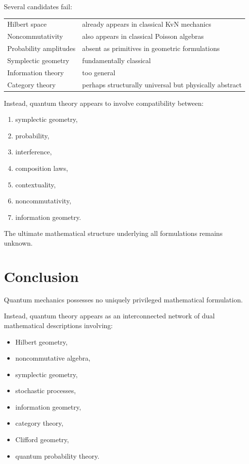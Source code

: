 \documentclass[11pt]{article}
\begin{document}
Several candidates fail:

\begin{center}
\begin{tabular}{ll}
Hilbert space & already appears in classical KvN mechanics \\
Noncommutativity & also appears in classical Poisson algebras \\
Probability amplitudes & absent as primitives in geometric formulations \\
Symplectic geometry & fundamentally classical \\
Information theory & too general \\
Category theory & perhaps structurally universal but physically abstract
\end{tabular}
\end{center}

Instead, quantum theory appears to involve compatibility between:

\begin{enumerate}
\item symplectic geometry,
\item probability,
\item interference,
\item composition laws,
\item contextuality,
\item noncommutativity,
\item information geometry.
\end{enumerate}

The ultimate mathematical structure underlying all formulations remains unknown.



\section{Conclusion}

Quantum mechanics possesses no uniquely privileged mathematical formulation.

Instead, quantum theory appears as an interconnected network of dual mathematical descriptions involving:

\begin{itemize}
\item Hilbert geometry,
\item noncommutative algebra,
\item symplectic geometry,
\item stochastic processes,
\item information geometry,
\item category theory,
\item Clifford geometry,
\item quantum probability theory.
\end{itemize}
\end{document}
